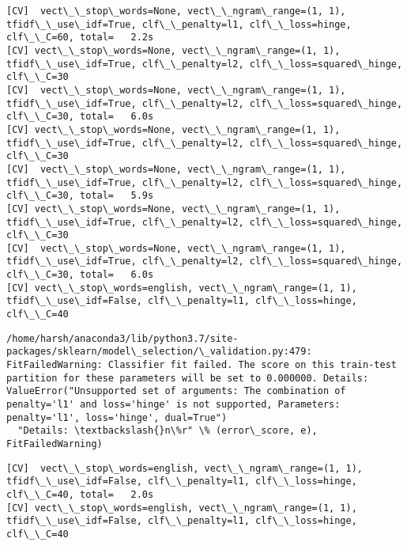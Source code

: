 \documentclass[11pt]{article}
\begin{document}
    \begin{Verbatim}[commandchars=\\\{\}]
[CV]  vect\_\_stop\_words=None, vect\_\_ngram\_range=(1, 1), tfidf\_\_use\_idf=True, clf\_\_penalty=l1, clf\_\_loss=hinge, clf\_\_C=60, total=   2.2s
[CV] vect\_\_stop\_words=None, vect\_\_ngram\_range=(1, 1), tfidf\_\_use\_idf=True, clf\_\_penalty=l2, clf\_\_loss=squared\_hinge, clf\_\_C=30 
[CV]  vect\_\_stop\_words=None, vect\_\_ngram\_range=(1, 1), tfidf\_\_use\_idf=True, clf\_\_penalty=l2, clf\_\_loss=squared\_hinge, clf\_\_C=30, total=   6.0s
[CV] vect\_\_stop\_words=None, vect\_\_ngram\_range=(1, 1), tfidf\_\_use\_idf=True, clf\_\_penalty=l2, clf\_\_loss=squared\_hinge, clf\_\_C=30 
[CV]  vect\_\_stop\_words=None, vect\_\_ngram\_range=(1, 1), tfidf\_\_use\_idf=True, clf\_\_penalty=l2, clf\_\_loss=squared\_hinge, clf\_\_C=30, total=   5.9s
[CV] vect\_\_stop\_words=None, vect\_\_ngram\_range=(1, 1), tfidf\_\_use\_idf=True, clf\_\_penalty=l2, clf\_\_loss=squared\_hinge, clf\_\_C=30 
[CV]  vect\_\_stop\_words=None, vect\_\_ngram\_range=(1, 1), tfidf\_\_use\_idf=True, clf\_\_penalty=l2, clf\_\_loss=squared\_hinge, clf\_\_C=30, total=   6.0s
[CV] vect\_\_stop\_words=english, vect\_\_ngram\_range=(1, 1), tfidf\_\_use\_idf=False, clf\_\_penalty=l1, clf\_\_loss=hinge, clf\_\_C=40 

    \end{Verbatim}

    \begin{Verbatim}[commandchars=\\\{\}]
/home/harsh/anaconda3/lib/python3.7/site-packages/sklearn/model\_selection/\_validation.py:479: FitFailedWarning: Classifier fit failed. The score on this train-test partition for these parameters will be set to 0.000000. Details: 
ValueError("Unsupported set of arguments: The combination of penalty='l1' and loss='hinge' is not supported, Parameters: penalty='l1', loss='hinge', dual=True")
  "Details: \textbackslash{}n\%r" \% (error\_score, e), FitFailedWarning)

    \end{Verbatim}

    \begin{Verbatim}[commandchars=\\\{\}]
[CV]  vect\_\_stop\_words=english, vect\_\_ngram\_range=(1, 1), tfidf\_\_use\_idf=False, clf\_\_penalty=l1, clf\_\_loss=hinge, clf\_\_C=40, total=   2.0s
[CV] vect\_\_stop\_words=english, vect\_\_ngram\_range=(1, 1), tfidf\_\_use\_idf=False, clf\_\_penalty=l1, clf\_\_loss=hinge, clf\_\_C=40 

    \end{Verbatim}
\end{document}
